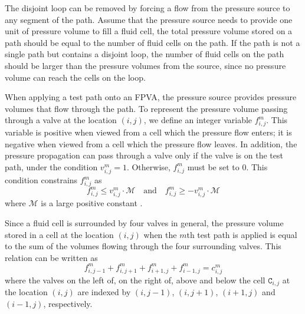 \documentclass[journal,twoside]{IEEEtran}
\begin{document}
The disjoint loop can be removed by forcing a flow from the pressure source
to any segment of the path. Assume that the pressure source needs to provide one
unit of pressure volume to fill a fluid cell, the total pressure volume stored
on a path should be equal to the number of fluid cells on the path. If the path
is not a single path but contains a disjoint loop, the number of fluid cells on
the path should be larger than the pressure volumes from the source, since
no pressure volume can reach the cells on the loop. 

When applying a test path onto an FPVA, the pressure source provides pressure
volumes that flow through the path.
To represent the pressure volume passing through a valve at the
location $(i,j)$,  we define an integer variable $f^m_{i,j}$.  This variable is
positive when viewed from a cell which the pressure flow enters; it is negative
when viewed from a cell which the pressure flow leaves. In addition, the pressure
propagation can pass through a valve only if the valve is on the test path, under the
condition $v^m_{i,j}=1$. Otherwise, $f^m_{i,j}$ must be set to 0. This
condition constrains $f^m_{i,j}$ as
\begin{equation}
  \label{eq:flow_var}
  f^m_{i,j}\le v^m_{i,j}\cdot\mathcal{M} \quad \text{and}\quad f^m_{i,j}\ge
  -v^m_{i,j}\cdot\mathcal{M} 
\end{equation}
where $\mathcal{M}$ is a large positive constant %
\cite{chen2011applied}.

Since a fluid cell is surrounded by four valves in general,
the pressure volume stored in a cell at the location $(i,j)$ 
when the $m$th test path is applied is equal to the sum of the
volumes flowing through the four surrounding valves. 
This relation can be written as
\begin{equation}
\label{eq:flow_sum}
f^m_{i,j-1}+ f^m_{i,j+1}+ f^m_{i+1,j}+ f^m_{i-1,j} = c^m_{i,j}
\end{equation} 
where the valves on the left of, on the right of, above and below the cell
$\mathtt{C}_{i,j}$ at the location
$(i,j)$ are indexed by $(i,j-1)$, $(i,j+1)$, $(i+1,j)$ and $(i-1,j)$,
respectively. 
\end{document}
